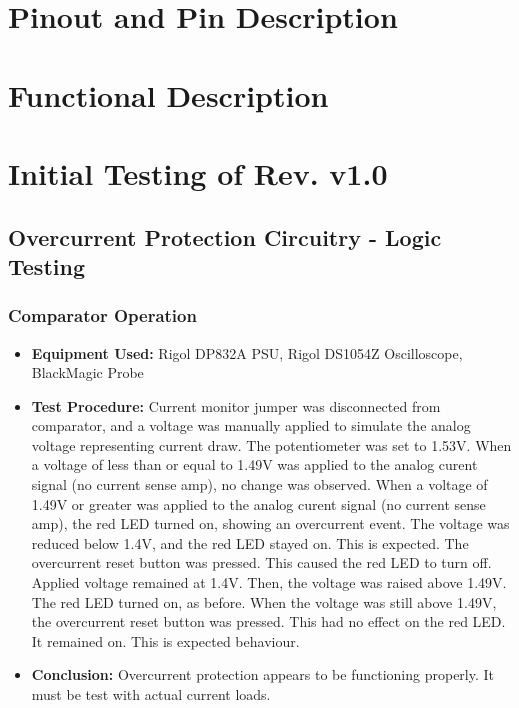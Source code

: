   \section{Pinout and Pin Description}
  
  \section{Functional Description}
  
  \section{Initial Testing of Rev. v1.0}
  
  \subsection{Overcurrent Protection Circuitry - Logic Testing}
  
  \subsubsection{Comparator Operation}

  \begin{itemize}
          \item \textbf{Equipment Used:} Rigol DP832A PSU, Rigol DS1054Z Oscilloscope, BlackMagic Probe
          \item \textbf{Test Procedure:} Current monitor jumper was disconnected from comparator, and a voltage was manually applied to simulate the analog voltage representing current draw.
          The potentiometer was set to 1.53V. 
          When a voltage of less than or equal to 1.49V was applied to the analog curent signal (no current sense amp), no change was observed.
          When a voltage of 1.49V or greater was applied to the analog curent signal (no current sense amp), the red LED turned on, showing an overcurrent event.
          The voltage was reduced below 1.4V, and the red LED stayed on.
          This is expected. 
          The overcurrent reset button was pressed. 
          This caused the red LED to turn off. 
          Applied voltage remained at 1.4V. 
          Then, the voltage was raised above 1.49V.
          The red LED turned on, as before.
          When the voltage was still above 1.49V, the overcurrent reset button was pressed.
          This had no effect on the red LED. 
          It remained on. 
          This is expected behaviour.
          \item \textbf{Conclusion:} Overcurrent protection appears to be functioning properly.
          It must be test with actual current loads.
  \end{itemize}

